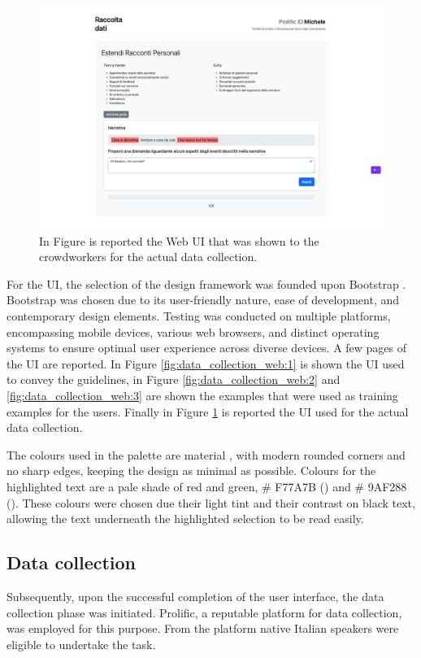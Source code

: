 \begin{figure}[!htbp]
    \centering
    \includegraphics[width=1\linewidth]{assets//imgs/UI-datacollection.png}
    \caption{In Figure is reported the Web UI that was shown to the crowdworkers for the actual data collection.}
    \label{fig:data_collection_web:4}
\end{figure}

For the UI, the selection of the design framework was founded upon Bootstrap \cite{bootstrap}. Bootstrap was chosen due to its user-friendly nature, ease of development, and contemporary design elements. Testing was conducted on multiple platforms, encompassing mobile devices, various web browsers, and distinct operating systems to ensure optimal user experience across diverse devices.
A few pages of the UI are reported. In Figure \ref{fig:data_collection_web:1} is shown the UI used to convey the guidelines, in Figure \ref{fig:data_collection_web:2} and \ref{fig:data_collection_web:3} are shown the examples that were used as training examples for the users. Finally in Figure \ref{fig:data_collection_web:4} is reported the UI used for the actual data collection.

The colours used in the palette are material \cite{material}, with modern rounded corners and no sharp edges, keeping the design as minimal as possible. Colours for the highlighted text are a pale shade of red and green, \# F77A7B (\redbg{\hspace{1em}}) and \# 9AF288 (\greenbg{\hspace{1em}}). These colours were chosen due their light tint and their contrast on black text, allowing the text underneath the highlighted selection to be read easily.


\subsection{Data collection}
\label{cha:methodology-data-collection}
Subsequently, upon the successful completion of the user interface, the data collection phase was initiated. Prolific, a reputable platform \cite{prolific} for data collection, was employed for this purpose. From the platform native Italian speakers were eligible to undertake the task.

